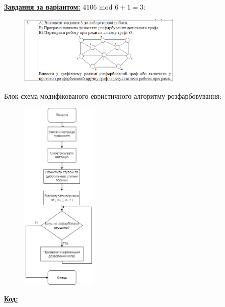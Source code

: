 \documentclass[12pt,a4paper]{article}
\begin{document}
\begin{itemize}
    \end{itemize}

    \newpage

    \textbf{\underline{Завдання за варіантом:}} $4106$ mod $6 + 1 = 3$:

    \begin{figure}[ht]
        \includegraphics[width=0.7\textwidth]{photo1.png}
    \end{figure}

    \setlength{\parindent}{0pt}

    Блок-схема модифікованого евристичного алгоритму розфарбовування:

    \begin{figure}[ht]
        \includegraphics[width=0.326\textwidth]{diagram.png}
    \end{figure}

    \newpage

    \textbf{\underline{Код:}}

    \vspace{1em}
\end{document}
